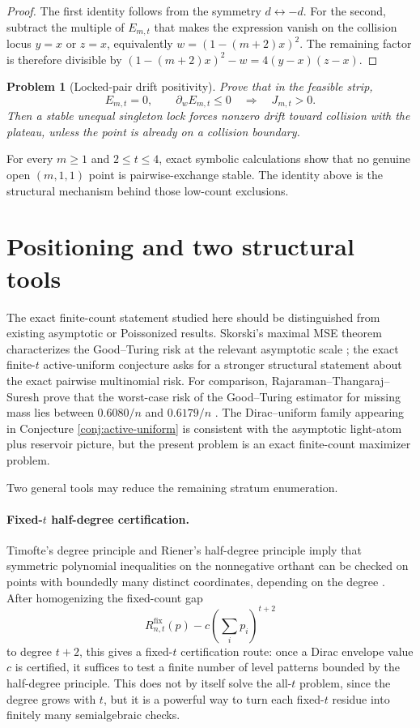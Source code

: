 \documentclass[11pt]{article}
\newtheorem{problem}[theorem]{Problem}
\theoremstyle{definition}
\newcommand{\fix}{\mathrm{fix}}
\begin{document}
\begin{proof}
The first identity follows from the symmetry $d\leftrightarrow-d$.  For the
second, subtract the multiple of $E_{m,t}$ that makes the expression vanish
on the collision locus $y=x$ or $z=x$, equivalently
$w=(1-(m+2)x)^2$.  The remaining factor is therefore divisible by
$(1-(m+2)x)^2-w=4(y-x)(z-x)$.
\end{proof}

\begin{problem}[Locked-pair drift positivity]\label{prob:locked-positivity}
Prove that in the feasible strip,
\[
  E_{m,t}=0,
  \qquad
  \partial_wE_{m,t}\le0
  \quad\Longrightarrow\quad
  J_{m,t}>0.
\]
Then a stable unequal singleton lock forces nonzero drift toward collision
with the plateau, unless the point is already on a collision boundary.
\end{problem}

For every $m\ge1$ and $2\le t\le4$, exact symbolic calculations show that
no genuine open $(m,1,1)$ point is pairwise-exchange stable.  The identity
above is the structural mechanism behind those low-count exclusions.

\section{Positioning and two structural tools}\label{sec:positioning}

The exact finite-count statement studied here should be distinguished from
existing asymptotic or Poissonized results.  Skorski's maximal MSE theorem
characterizes the Good--Turing risk at the relevant asymptotic scale
\cite{Skorski2021}; the exact finite-$t$ active-uniform conjecture asks for
a stronger structural statement about the exact pairwise multinomial risk.
For comparison, Rajaraman--Thangaraj--Suresh prove that the worst-case risk
of the Good--Turing estimator for missing mass lies between $0.6080/n$ and
$0.6179/n$ \cite{RajaramanThangarajSuresh2017}.  The Dirac--uniform family
appearing in Conjecture \ref{conj:active-uniform} is consistent with the
asymptotic light-atom plus reservoir picture, but the present problem is an
exact finite-count maximizer problem.

Two general tools may reduce the remaining stratum enumeration.

\paragraph{Fixed-$t$ half-degree certification.}
Timofte's degree principle and Riener's half-degree principle imply that
symmetric polynomial inequalities on the nonnegative orthant can be checked
on points with boundedly many distinct coordinates, depending on the degree
\cite{Timofte2003,Riener2012}.  After homogenizing the fixed-count gap
\[
  R_{n,t}^{\fix}(p)-c\left(\sum_i p_i\right)^{t+2}
\]
to degree $t+2$, this gives a fixed-$t$ certification route: once a Dirac
envelope value $c$ is certified, it suffices to test a finite number of
level patterns bounded by the half-degree principle.  This does not by
itself solve the all-$t$ problem, since the degree grows with $t$, but it is
a powerful way to turn each fixed-$t$ residue into finitely many
semialgebraic checks.
\end{document}
